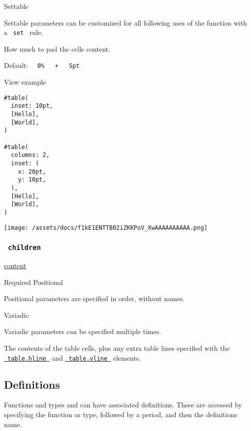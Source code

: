{{ Settable }}

\label{parameters-inset-settable-tooltip}
Settable parameters can be customized for all following uses of the
function with a \texttt{\ set\ } rule.

How much to pad the cells\textquotesingle{} content.

Default:
\texttt{\ }{\texttt{\ 0\%\ }}\texttt{\ }{\texttt{\ +\ }}\texttt{\ }{\texttt{\ 5pt\ }}\texttt{\ }


View example

\begin{verbatim}
#table(
  inset: 10pt,
  [Hello],
  [World],
)

#table(
  columns: 2,
  inset: (
    x: 20pt,
    y: 10pt,
  ),
  [Hello],
  [World],
)
\end{verbatim}

\texttt{[image: /assets/docs/f1kE1ENTTB02iZKKPoV\_XwAAAAAAAAAA.png]}

\subsubsection{\texorpdfstring{\texttt{\ children\ }}{ children }}\label{parameters-children}

\href{/docs/reference/foundations/content/}{content}

{Required} {{ Positional }}

\label{parameters-children-positional-tooltip}
Positional parameters are specified in order, without names.

{{ Variadic }}

\label{parameters-children-variadic-tooltip}
Variadic parameters can be specified multiple times.

The contents of the table cells, plus any extra table lines specified
with the
\href{/docs/reference/model/table/\#definitions-hline}{\texttt{\ table.hline\ }}
and
\href{/docs/reference/model/table/\#definitions-vline}{\texttt{\ table.vline\ }}
elements.

\subsection{\texorpdfstring{{ Definitions
}}{ Definitions }}\label{definitions}

\label{definitions-tooltip}
Functions and types and can have associated definitions. These are
accessed by specifying the function or type, followed by a period, and
then the definition\textquotesingle s name.

